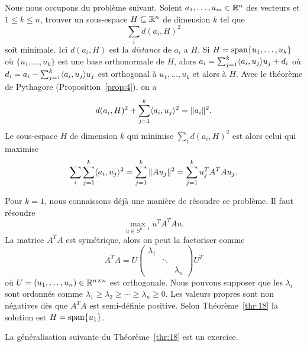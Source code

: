 Nous nous occupons du problème suivant. Soient $a_1,\dots,a_m \in \mathbb{R}^n$ des vecteurs et $1 \leq k \leq n$, trouver un sous-espace $H \subseteq \mathbb{R}^n$ de dimension $k$ tel que 
\begin{displaymath}
  \sum_i d(a_i,H)^2 
\end{displaymath}
soit minimale. Ici $d(a_i,H)$ est la \emph{distance} de $a_i$ a $H$. Si $H = \operatorname{span}\{u_1,\dots,u_k\}$ où $\{u_1,\dots,u_k\}$  est une base orthonormale de $H$, alors $a_i = \sum_{j=1}^k \langle {a_i,u_j} \rangle u_j + d_i$ où $d_i = a_i - \sum_{j=1}^k \langle {a_i,u_j} \rangle u_j$ est orthogonal à $u_1,\dots,u_k$ et alors à $H$.  Avec le théorème de Pythagore (Proposition~\ref{prop:4}), on a
\begin{displaymath}
  d(a_i,H)^2 + \sum_{j=1}^k \langle {a_i,u_j} \rangle^2 = \|a_i\|^2. 
\end{displaymath}
Le sous-espace $H$ de dimension $k$ qui minimise $\sum_i d(a_i,H)^2$ est alors celui qui maximise 
\begin{displaymath}
\sum_i  \sum_{j=1}^k \langle {a_i,u_j} \rangle^2 = \sum_{j=1}^k \|A u_j\|^2 = \sum_{j=1}^k u_j^T A^TAu_j.
\end{displaymath}

Pour $k=1$, nous connaissons déjà une manière de résoudre ce problème. Il faut résoudre 
\begin{displaymath}
\max_{u \in S^{n-1}}   u^TA^TAu .
\end{displaymath}
La matrice $A^TA$ est symétrique, alors on peut la factoriser comme 
\begin{equation}
  \label{eq:17}
  A^TA = U
  \begin{pmatrix}
    \lambda_1 \\
    & \ddots \\
    & & \lambda_n
  \end{pmatrix} U^T
\end{equation}
où $U = \left(u_1,\dots,u_n\right) \in \mathbb{R}^{n \times n}$ est orthogonale. Nous pouvons supposer que les $\lambda_i$ sont ordonnés comme $\lambda_1 \geq \lambda_2 \geq \cdots \geq \lambda_n \geq 0$. Les valeurs propres sont non négatives dès que $A^TA$ est semi-définie positive. Selon Théorème~\ref{thr:18} la solution est $H = \operatorname{span}\{u_1\}$. 

\medskip 
La généralisation suivante du Théorème~\ref{thr:18} est un exercice. 

